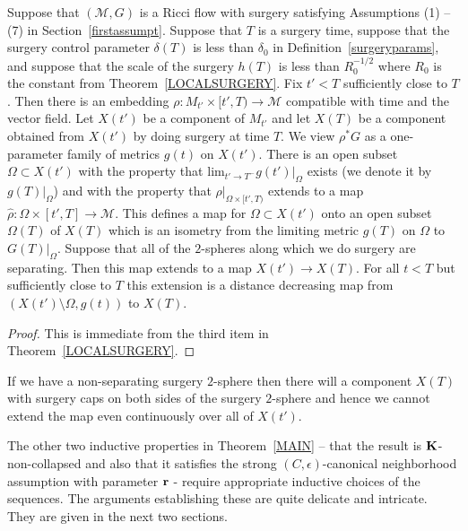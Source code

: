 \begin{proposition}
\label{prop:surgery-distance-decreasing}
\label{surgerydist}
Suppose that $({\mathcal M},G)$ is a Ricci flow with surgery
satisfying Assumptions (1) -- (7) in Section~\ref{firstassumpt}.
Suppose that $T$ is a surgery time, suppose  that the surgery
control parameter $\delta(T)$ is less than $\delta_0$ in
Definition~\ref{surgeryparams}, and suppose that the scale of the
surgery $h(T)$ is less than $R_0^{-1/2}$ where $R_0$ is the constant
from Theorem~\ref{LOCALSURGERY}. Fix $t'<T$  sufficiently close to
$T$. Then  there is an embedding $\rho\colon M_{t'}\times [t',T)\to
{\mathcal M}$ compatible with time and the vector field. Let $X(t')$
be a component of $M_{t'}$ and let $X(T)$ be a component obtained
from $X(t')$ by doing surgery at time $T$. We view $\rho^*G$ as a
one-parameter family of metrics $g(t)$ on $X(t')$. There is an open
subset $\Omega\subset X(t')$ with the property that $\mathrm{lim}_{t'\rightarrow T^-} g(t')|_\Omega$ exists (we denote it by
$g(T)|_\Omega$) and with the property that $\rho|_{\Omega\times
[t',T)}$ extends to a map $\widehat \rho\colon \Omega\times
[t',T]\to {\mathcal M}$. This defines a map for $\Omega\subset
X(t')$ onto an open subset $\Omega(T)$ of $X(T)$ which is an
isometry from the limiting metric $g(T)$ on $\Omega$ to
$G(T)|_{\Omega}$. Suppose that all of the $2$-spheres along which we
do surgery are separating. Then this map extends to a map $X(t')\to
X(T)$. For all $t<T$ but sufficiently close to $T$ this extension is
a distance decreasing map from $(X(t')\setminus \Omega,g(t))$ to
$X(T)$.
\end{proposition}

\begin{proof}
This is immediate from the third item in Theorem~\ref{LOCALSURGERY}.
\end{proof}


\begin{remark}
\label{rem:nonseparating-surgery-sphere}
If we have a non-separating surgery $2$-sphere then there will a
component $X(T)$ with surgery caps on both sides of the surgery
$2$-sphere and hence we cannot extend the map even continuously
over all of $X(t')$.
\end{remark}

The other two inductive properties in Theorem~\ref{MAIN} -- that the result is
${\bf K}$-non-collapsed and also that it satisfies the strong
$(C,\epsilon)$-canonical neighborhood assumption with parameter ${\bf r}$ -
require appropriate inductive choices of the sequences. The arguments
establishing these are quite delicate and intricate. They are given in the next
two sections.

